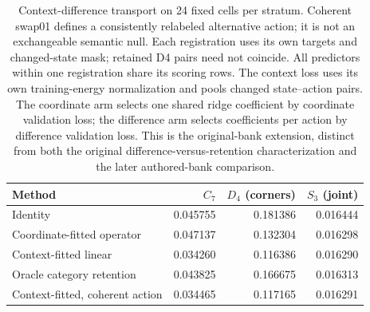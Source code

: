 \begin{table}[htbp]
\caption{Context-difference transport on 24 fixed cells per stratum. Coherent swap01 defines a consistently relabeled alternative action; it is not an exchangeable semantic null. Each registration uses its own targets and changed-state mask; retained D4 pairs need not coincide. All predictors within one registration share its scoring rows. The context loss uses its own training-energy normalization and pools changed state--action pairs. The coordinate arm selects one shared ridge coefficient by coordinate validation loss; the difference arm selects coefficients per action by difference validation loss. This is the original-bank extension, distinct from both the original difference-versus-retention characterization and the later authored-bank comparison.}
\label{tab:reproduction-context}\centering\small
\begin{tabular}{lrrr}\toprule
Method & $C_7$ & $D_4$ (corners) & $S_3$ (joint) \\
\midrule
Identity & 0.045755 & 0.181386 & 0.016444 \\
Coordinate-fitted operator & 0.047137 & 0.132304 & 0.016298 \\
Context-fitted linear & 0.034260 & 0.116386 & 0.016290 \\
Oracle category retention & 0.043825 & 0.166675 & 0.016313 \\
Context-fitted, coherent action & 0.034465 & 0.117165 & 0.016291 \\
\bottomrule\end{tabular}
\end{table}
